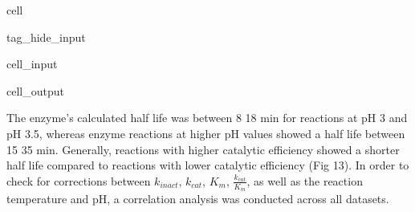 \documentclass[letterpaper,12pt,english]{jupyterBook}
\begin{document}
\begin{sphinxuseclass}{cell}
\begin{sphinxuseclass}{tag_hide_input}
\begin{sphinxVerbatimInput}
\begin{sphinxuseclass}{cell_input}
\end{sphinxuseclass}\end{sphinxVerbatimInput}
\begin{sphinxVerbatimOutput}

\begin{sphinxuseclass}{cell_output}
\noindent{}

\end{sphinxuseclass}\end{sphinxVerbatimOutput}

\end{sphinxuseclass}
\end{sphinxuseclass}


\sphinxAtStartPar
The enzyme’s calculated half life was between 8 \sphinxhyphen{} 18 min for reactions at pH 3 and pH 3.5, whereas enzyme reactions at higher pH values showed a half life between 15 \sphinxhyphen{} 35 min. Generally, reactions with higher catalytic efficiency showed a shorter half life compared to reactions with lower catalytic efficiency (Fig 13).
In order to check for corrections between \(k_{inact}\), \(k_{cat}\), \(K_{m}\), \(\frac{k_{cat}}{K_{m}}\), as well as the reaction temperature and pH, a correlation analysis was conducted across all datasets.
\end{document}
